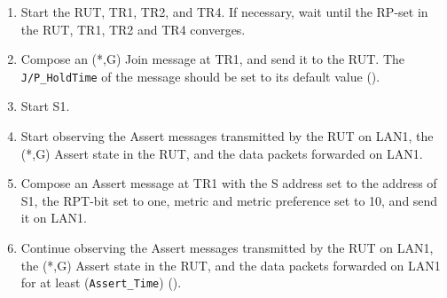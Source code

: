 \documentclass[11pt]{report}
\begin{document}

\begin{enumerate}

  \item Start the RUT, TR1, TR2, and TR4. If necessary, wait until the RP-set
  in the RUT, TR1, TR2 and TR4 converges.

  \item Compose an (*,G) Join message at TR1, and send it to the RUT.
  The \verb=J/P_HoldTime= of the message should be set to its default
  value ({\PimsmJPHoldTime}).

  \item Start S1.

  \item Start observing the Assert messages transmitted by the RUT on
  LAN1, the (*,G) Assert state in the RUT, and the data packets forwarded on
  LAN1.

  \item Compose an Assert message at TR1 with the S address set to the
  address of S1, the RPT-bit set to one, metric and metric preference set to
  10, and send it on LAN1.

  \item Continue observing the Assert messages transmitted by the RUT on
  LAN1, the (*,G) Assert state in the RUT, and the data packets forwarded on
  LAN1 for at least (\verb=Assert_Time=) ({\PimsmAssertTime}).

\end{enumerate}

\end{document}
